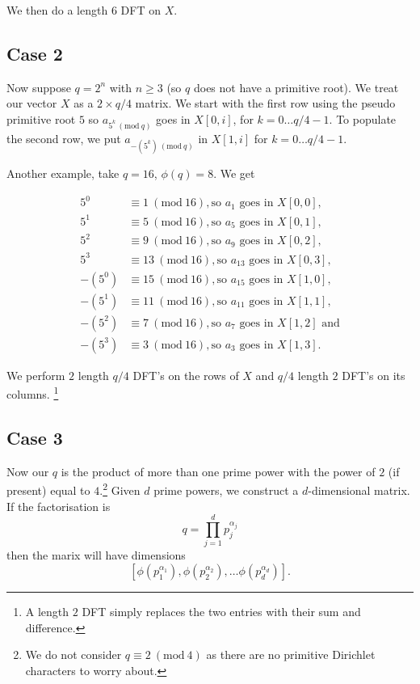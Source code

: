 \documentclass[12pt]{amsart}
\newcommand{\Mod}[1]{\ (\mathrm{mod}\ #1)}
\theoremstyle{remark}
\numberwithin{theorem}{section}
\numberwithin{equation}{section}
\begin{document}
We then do a length $6$ DFT on $X$.

\subsection{Case 2}

Now suppose $q=2^n$ with $n\geq 3$ (so $q$ does not have a primitive root). We treat our vector $X$ as a $2\times q/4$ matrix. We start with the first row using the pseudo primitive root $5$ so $a_{5^k\Mod {q}}$ goes in $X[0,i]$, for $k=0\ldots q/4-1$. To populate the second row, we put $a_{-(5^k)\Mod{q}}$ in $X[1,i]$ for $k=0\ldots q/4-1$.

Another example, take $q=16$, $\phi(q)=8$. We get

\begin{equation}\label{eq:ex16}
  \begin{split}
    5^0 &\equiv 1\Mod{16}, \textrm{so }a_1\textrm{ goes in } X[0,0],\\
    5^1 &\equiv 5\Mod{16}, \textrm{so }a_5\textrm{ goes in } X[0,1],\\
    5^2 &\equiv 9\Mod{16}, \textrm{so }a_9\textrm{ goes in } X[0,2],\\
    5^3 &\equiv 13\Mod{16}, \textrm{so }a_{13}\textrm{ goes in } X[0,3],\\
    -(5^0) &\equiv 15\Mod{16}, \textrm{so }a_{15}\textrm{ goes in } X[1,0],\\
    -(5^1) &\equiv 11\Mod{16}, \textrm{so } a_{11}\textrm{ goes in } X[1,1],\\
    -(5^2) &\equiv 7\Mod{16}, \textrm{so } a_7\textrm{ goes in } X[1,2] \textrm{ and}\\
    -(5^3) &\equiv 3\Mod{16}, \textrm{so } a_3\textrm{ goes in } X[1,3].
  \end{split}
\end{equation}

We perform $2$ length $q/4$ DFT's on the rows of $X$ and $q/4$ length $2$ DFT's on its columns. \footnote{A length $2$ DFT simply replaces the two entries with their sum and difference.}

\subsection{Case 3}

Now our $q$ is the product of more than one prime power with the power of $2$ (if present) equal to $4$.\footnote{We do not consider $q\equiv 2\Mod{4}$ as there are no primitive Dirichlet characters to worry about.} Given $d$ prime powers, we construct a $d$-dimensional matrix.  If the factorisation is
$$
q=\prod_{j=1}^d p_j^{\alpha_j}
$$
then the marix will have dimensions
$$
[\phi(p_1^{\alpha_1}),\phi(p_2^{\alpha_2}),\ldots\phi(p_d^{\alpha_d})].
$$
\end{document}
